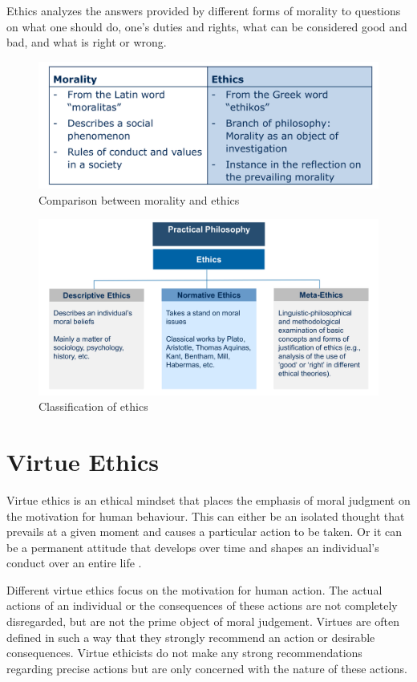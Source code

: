 \documentclass[11pt]{article}
\theoremstyle{definition}
\begin{document}
Ethics analyzes the answers provided by different forms of morality to questions on what one should do, one's duties and rights, what can be considered good and bad, and what is right or wrong.

\begin{figure}[tbh]
	\centering
	\includegraphics[width=0.6\linewidth]{img/morality_ethics}
	\caption{Comparison between morality and ethics}
	\label{fig:moralityethics}
\end{figure}

\begin{figure}[tbh]
	\centering
	\includegraphics[width=0.8\linewidth]{img/classification_ethics}
	\caption{Classification of ethics}
	\label{fig:classificationethics}
\end{figure}

\section{Virtue Ethics}
Virtue ethics is an ethical mindset that places the emphasis of moral judgment on the motivation for human behaviour. This can either be an isolated thought that prevails at a given moment and causes a particular action to be taken. Or it can be a permanent attitude that develops over time and shapes an individual’s conduct over an entire life \parencite{hubner2018einfuhrung}.

Different virtue ethics focus on the motivation for human action. The actual actions of an individual or the consequences of these actions are not completely disregarded, but are not the prime object of moral judgement. Virtues are often defined in such a way that they strongly recommend an action or desirable consequences. Virtue ethicists do not make any strong recommendations regarding precise actions but are only concerned with the nature of these actions.
\end{document}
